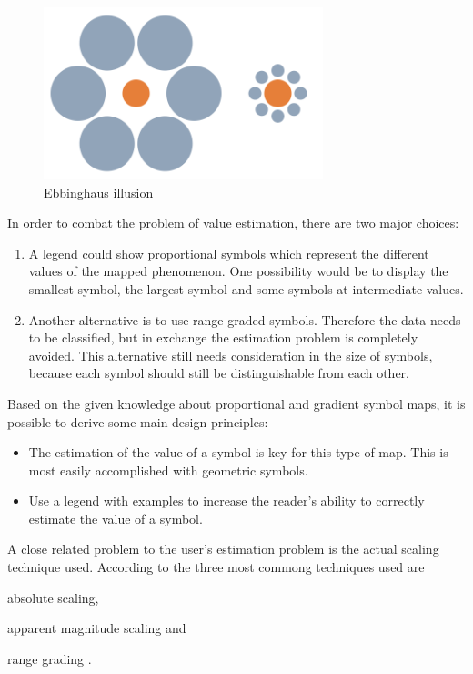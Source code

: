 \begin{figure}[!htb]
\centering
\includegraphics[height=5cm,keepaspectratio]{images/psm/ebbinghaus.png}
\caption[
    Ebbinghaus illusion, Urldate: 07.2016 \newline
    \small\texttt{\url{https://upload.wikimedia.org/wikipedia/commons/b/bc/Mond-vergleich.svg}}
]{Ebbinghaus illusion}
\label{fig:ebbinghaus}
\end{figure}

In order to combat the problem of value estimation, there are two major choices:
\begin{enumerate}
\item A legend could show proportional symbols which represent the different values of the mapped phenomenon. One possibility would be to display the smallest symbol, the largest symbol and some symbols at intermediate values.
\item Another alternative is to use range-graded symbols. Therefore the data needs to be classified, but in exchange the estimation problem is completely avoided. This alternative still needs consideration in the size of symbols, because each symbol should still be distinguishable from each other.
\end{enumerate}

Based on the given knowledge about proportional and gradient symbol maps, it is possible to derive some main design principles:
\begin{itemize}
\item The estimation of the value of a symbol is key for this type of map. This is most easily accomplished with geometric symbols.
\item Use a legend with examples to increase the reader's ability to correctly estimate the value of a symbol.
\end{itemize}

A close related problem to the user's estimation problem is the actual scaling technique used. According to \citeauthor{Dent2008} the three most commong techniques used are
\begin{enumerate*}[label={(\arabic*)}]
\item absolute scaling,
\item apparent magnitude scaling and
\item range grading .
\end{enumerate*}

